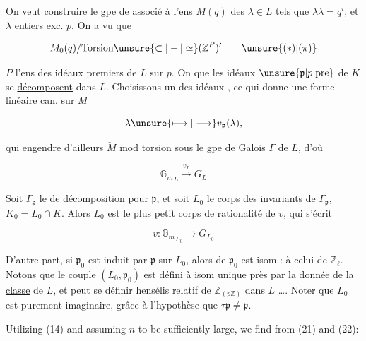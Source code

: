 On veut construire le gpe de   associé
à l'ens $M(q)$ des $\lambda\in L$ tels que $\lambda\bar\lambda=q^i$,
et $\lambda$ entiers exc. $p$. On a vu que

\[
M_0(q)/\mathrm{Torsion}\unsure{\subset|-|\simeq}(\mathbb Z^P)'\tag*{\unsure{(\ensuremath{*})|(\ensuremath{\pi})}}
\]

$P$ l'ens des idéaux premiers de $L$ sur $p$.
On  que les idéaux $\unsure{\mathfrak p|p|\text{pre}}$ de $K$ se \uline{décomposent} dans $L$.
Choisissons un des  idéaux , ce qui donne
une forme linéaire can. sur $M$

\[
\lambda\unsure{\longmapsto|\longrightarrow}v_{\mathfrak p}(\lambda),
\]

qui engendre d'ailleurs $\check M$ mod torsion sous  le
gpe de Galois $\Gamma$ de $L$, d'où

\[
{\mathbb G_m}_L\xrightarrow{v_L}G_L
\]

Soit $\Gamma_{\mathfrak p}$ le  de décomposition pour $\mathfrak p$,  et soit  $L_0$ le corps des
invariants de $\Gamma_{\mathfrak p}$, $K_0=L_0\cap K$. Alors
$L_0$ est le plus petit corps de rationalité de $v$,
qui s'écrit 

\[
v:{\mathbb G_m}_{L_0}\longrightarrow G_{L_0}
\]

D'autre part, si $\mathfrak p_0$ est induit par $\mathfrak p$ sur $L_0$,
alors  
de $\mathfrak p_0$ est  isom : à celui de
$\mathbb Z_{\ell}$. Notons que le couple $(L_0,\mathfrak p_0)$ est défini
à isom unique près par la donnée de la \uline{classe}
de $L$, et peut se définir    hensélis
relatif de $\mathbb Z_{(p\mathbb Z)}$ dans $L$ \ldots. Noter que $L_0$ est
purement imaginaire, grâce à l'hypothèse
que $\tau\mathfrak p\ne\mathfrak p$.



Utilizing (14) and assuming $n$ to be sufficiently
large, we find from (21) and (22):

